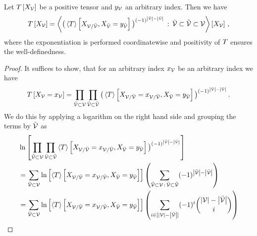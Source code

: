 \begin{lemma}\label{the:contractionFactorization}
	Let $T\left[X_{\mathcal{V}}\right]$ be a positive tensor and $y_{\mathcal{V}}$ an arbitrary index.
	Then we have
	\begin{align*}
		T\left[X_{\mathcal{V}}\right]
		= \left\langle 
			\big(\left\langle T\right\rangle \left[ X_{\mathcal{V}/\bar{\mathcal{V}}}, X_{\bar{\mathcal{V}}} = y_{\bar{\mathcal{V}}} \right]\big)^{(-1)^{\left|\tilde{\mathcal{V}}\right|-\left|\bar{\mathcal{V}}\right|}} \, : \, \bar{\mathcal{V}} \subset \tilde{\mathcal{V}} \subset \mathcal{V}
		\right\rangle \left[ X_{\mathcal{V}} \right] \, ,
	\end{align*}
	where the exponentiation is performed coordinatewise and positivity of $T$ ensures the well-definedness.
\end{lemma}
\begin{proof}
	It suffices to show, that for an arbitrary index $x_{\mathcal{V}}$ be an arbitrary index we have
	\begin{align*}
		T\left[X_{\mathcal{V}}=x_{\mathcal{V}}\right]
		= \prod_{\tilde{\mathcal{V}}\subset\mathcal{V}} \prod_{\bar{\mathcal{V}}\subset\tilde{\mathcal{V}}}
			\big(\left\langle T\right\rangle \left[ X_{\mathcal{V}/\bar{\mathcal{V}}}=x_{\mathcal{V}/\bar{\mathcal{V}}}, X_{\bar{\mathcal{V}}} = y_{\bar{\mathcal{V}}} \right]\big)^{(-1)^{\left|\tilde{\mathcal{V}}\right|-\left|\bar{\mathcal{V}}\right|}} \, .
	\end{align*}
	We do this by applying a logarithm on the right hand side and grouping the terms by $\bar{\mathcal{V}}$ as
	\begin{align*}
		& \ln \left[ \prod_{\tilde{\mathcal{V}}\subset\mathcal{V}} \prod_{\bar{\mathcal{V}}\subset\tilde{\mathcal{V}}}
			\left\langle T\right\rangle \left[ X_{\mathcal{V}/\bar{\mathcal{V}}}=x_{\mathcal{V}/\bar{\mathcal{V}}}, X_{\bar{\mathcal{V}}} = y_{\bar{\mathcal{V}}} \right]\big)^{(-1)^{\left|\tilde{\mathcal{V}}\right|-\left|\bar{\mathcal{V}}\right|}} \right] \\
		& = \sum_{\bar{\mathcal{V}}\subset\mathcal{V}} \ln \left[ \left\langle T\right\rangle \left[ X_{\mathcal{V}/\bar{\mathcal{V}}}=x_{\mathcal{V}/\bar{\mathcal{V}}}, X_{\bar{\mathcal{V}}} = y_{\bar{\mathcal{V}}} \right] \right]
		\left( \sum_{\tilde{\mathcal{V}}\subset\mathcal{V} \, : \, \bar{\mathcal{V}}\subset \tilde{\mathcal{V}}} (-1)^{\left|\tilde{\mathcal{V}}\right|-\left|\bar{\mathcal{V}}\right|} \right) \\
		& =  \sum_{\bar{\mathcal{V}}\subset\mathcal{V}} \ln \left[ \left\langle T\right\rangle \left[ X_{\mathcal{V}/\bar{\mathcal{V}}}=x_{\mathcal{V}/\bar{\mathcal{V}}}, X_{\bar{\mathcal{V}}} = y_{\bar{\mathcal{V}}} \right] \right]
		\left( \sum_{i \in [\left|\mathcal{V}\right|-\left|\bar{\mathcal{V}}\right|]}  (-1)^{i}  \binom{\left|\mathcal{V}\right|-\left|\bar{\mathcal{V}}\right|}{i}  \right)
	\end{align*}

\end{proof}
